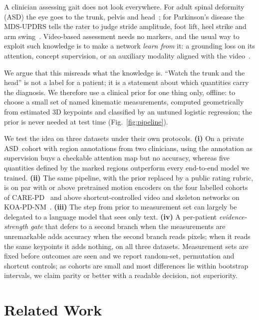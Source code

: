 \documentclass[runningheads]{llncs}
\newcommand{\asd}{ASD}
\begin{document}
A clinician assessing gait does not look everywhere. For adult spinal deformity (\asd) the
eye goes to the trunk, pelvis and head~\cite{glassman2005sagittal,schwab2012srs}; for
Parkinson's disease the MDS-UPDRS tells the rater to judge stride amplitude, foot lift, heel
strike and arm swing~\cite{goetz2008mdsupdrs}. Video-based assessment needs no markers, and
the usual way to exploit such knowledge is to make a network \emph{learn from} it: a
grounding loss on its attention, concept supervision, or an auxiliary modality aligned with
the video~\cite{koh2020cbm,radford2021clip}.

We argue that this misreads what the knowledge is. ``Watch the trunk and the head'' is not a
label for a patient; it is a statement about which quantities carry the diagnosis. We
therefore use a clinical prior for one thing only, offline: to choose a small set of named
kinematic measurements, computed geometrically from estimated 3D keypoints and classified
by an untuned logistic regression; the prior is never needed at test time
(Fig.~\ref{fig:pipeline}).

We test the idea on three datasets under their own protocols. \textbf{(i)} On a private
\asd\ cohort with region annotations from two clinicians, using the annotation as supervision
buys a checkable attention map but no accuracy, whereas five quantities defined by the
marked regions outperform every end-to-end model we trained. \textbf{(ii)} The same pipeline,
with the prior replaced by a public rating rubric, is on par with or above pretrained motion
encoders on the four labelled cohorts of CARE-PD~\cite{carepd2025} and above
shortcut-controlled video and skeleton networks on KOA-PD-NM~\cite{kour2022koapdnm_icicc}.
\textbf{(iii)} The step from prior to measurement set can largely be delegated to a language model
that sees only text. \textbf{(iv)} A per-patient \emph{evidence-strength gate} that defers to
a second branch when the measurements are unremarkable adds accuracy when the second branch
reads pixels; when it reads the same keypoints it adds nothing, on all three datasets.
Measurement sets are fixed before outcomes are seen and we report random-set, permutation
and shortcut controls; as cohorts are small and most differences lie within bootstrap
intervals, we claim parity or better with a readable decision, not superiority.

\section{Related Work}
\end{document}
